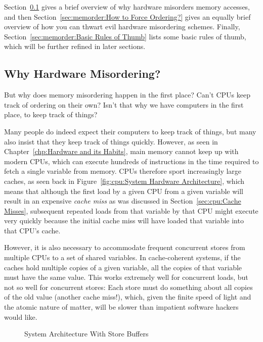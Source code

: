 Section~\ref{sec:memorder:Why Hardware Misordering?}
gives a brief overview of why hardware misorders memory accesses, and then
Section~\ref{sec:memorder:How to Force Ordering?}
gives an equally brief overview of how you can thwart evil hardware
misordering schemes.
Finally, Section~\ref{sec:memorder:Basic Rules of Thumb}
lists some basic rules of thumb, which will be further refined in
later sections.

\subsection{Why Hardware Misordering?}
\label{sec:memorder:Why Hardware Misordering?}

But why does memory misordering happen in the first place?
Can't CPUs keep track of ordering on their own?
Isn't that why we have computers in the first place, to keep track of things?

Many people do indeed expect their computers to keep track of things,
but many also insist that they keep track of things quickly.
However, as seen in Chapter~\ref{chp:Hardware and its Habits},
main memory cannot keep up with modern CPUs, which can execute
hundreds of instructions in the time required to fetch a single variable
from memory.
CPUs therefore sport increasingly large caches, as seen back in
Figure~\ref{fig:cpu:System Hardware Architecture}, which means that
although the first load by a given CPU from a given variable will
result in an expensive \emph{cache miss} as was discussed in
Section~\ref{sec:cpu:Cache Misses}, subsequent
repeated loads from that variable by that CPU might execute
very quickly because the initial cache miss will have loaded that
variable into that CPU's cache.

However, it is also necessary to accommodate frequent concurrent stores
from multiple CPUs to a set of shared variables.
In cache-coherent systems, if the caches hold multiple copies of a given
variable, all the copies of that variable must have the same value.
This works extremely well for concurrent loads, but not so well for
concurrent stores:  Each store must do something about all
copies of the old value (another cache miss!), which, given the finite
speed of light and the atomic nature of matter, will be slower
than impatient software hackers would like.

\begin{figure}[tb]
\centering
{}
\caption{System Architecture With Store Buffers}
\label{fig:memorder:System Architecture With Store Buffers}
\end{figure}

